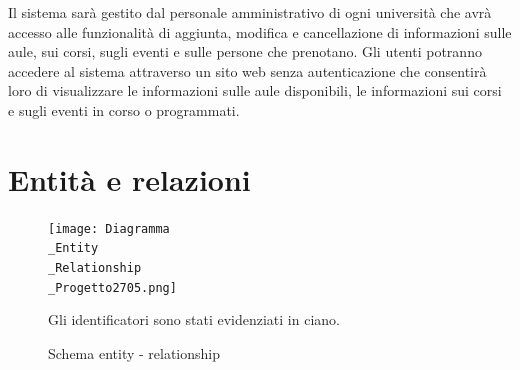\documentclass[a4paper, 10pt, oneside]{article} %
\begin{document}
Il sistema sarà gestito dal personale amministrativo di ogni università che avrà accesso alle funzionalità di aggiunta, modifica e cancellazione di informazioni sulle aule, sui corsi, sugli eventi e sulle persone che prenotano. Gli utenti potranno accedere al sistema attraverso un sito web senza autenticazione che consentirà loro di visualizzare le informazioni sulle aule disponibili, le informazioni sui corsi e sugli eventi in corso o programmati.


\section{Entità e relazioni}

\begin{figure}[h]
  \centering
\texttt{[image: Diagramma\\\_Entity\\\_Relationship\\\_Progetto2705.png]}
  \caption{Schema entity - relationship}
  Gli identificatori sono stati evidenziati in ciano.\\
\end{figure}

\newpage
\end{document}
